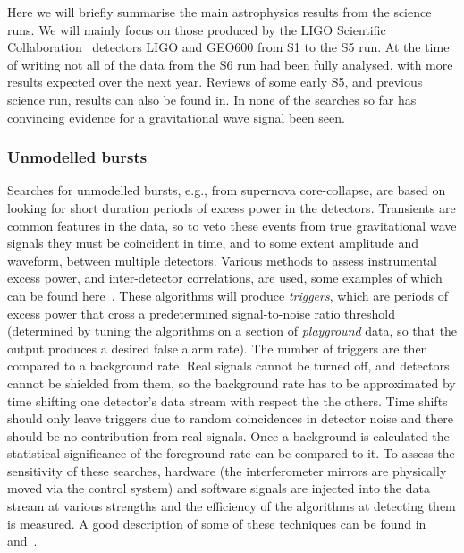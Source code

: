 \documentclass{article}
\begin{document}
Here we will briefly summarise the main astrophysics results from the science
runs. We will mainly focus on those produced by the LIGO Scientific
Collaboration~\cite{LSCweb} detectors LIGO and GEO600 from S1 to the S5 run.
At the time of writing not all of the data from the S6 run had been fully
analysed, with more results expected over the next year. Reviews of some early
S5, and previous science run, results can also be found in\cite{Papa:2008,
Fairhurst:2009}. In none of the searches so far has convincing evidence for a
gravitational wave signal been seen.

\subsubsection{Unmodelled bursts}
\label{subsubsection:unmodelled}

Searches for unmodelled bursts, e.g., from supernova core-collapse, are based on
looking for short duration periods of excess power in the detectors. Transients
are common features in the data, so to veto these events from true gravitational
wave signals they must be coincident in time, and to some extent amplitude and
waveform, between multiple detectors. Various methods to assess instrumental
excess power, and inter-detector correlations, are used, some examples of which
can be found here~\cite{Klimenko:2004, Anderson:2001, Searle:2008, McNabb:2004,
Cadonati:2004, Chatterji:2004, Chatterji:2006}. These algorithms will produce
\textit{triggers}, which are periods of excess power that cross a predetermined
signal-to-noise ratio threshold (determined by tuning the algorithms on a
section of \textit{playground} data, so that the output produces a desired false
alarm rate). The number of triggers are then compared to a background rate. Real
signals cannot be turned off, and detectors cannot be shielded from them, so the
background rate has to be approximated by time shifting one detector's data
stream with respect the the others. Time shifts should only leave triggers due
to random coincidences in detector noise and there should be no contribution
from real signals. Once a background is calculated the statistical significance
of the foreground rate can be compared to it. To assess the sensitivity of these
searches, hardware (the interferometer mirrors are physically moved via the
control system) and software signals are injected into the data stream at
various strengths and the efficiency of the algorithms at detecting them is
measured. A good description of some of these techniques can be found in
\cite{Abbott:2004b} and~\cite{Abbott:2006a}.
\end{document}
